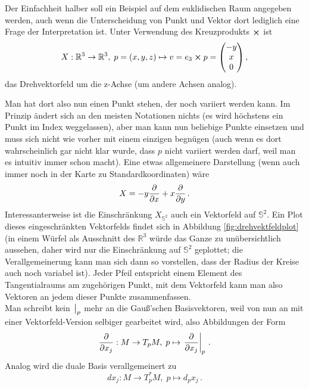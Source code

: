 \documentclass[../H_Analysis_main.tex]{subfiles}
\begin{document}
\begin{bsp}[Drehvektorfeld]\label{bsp:drehvekt}
Der Einfachheit halber soll ein Beispiel auf dem euklidischen Raum angegeben werden, auch wenn die Unterscheidung von Punkt und Vektor dort lediglich eine Frage der Interpretation ist. Unter Verwendung des Kreuzprodukts $\cross$ ist
\begin{equation}
X: \mathbb{R}^3 \rightarrow \mathbb{R}^3, \; p = (x, y, z) \mapsto v = e_3 \cross p = \mqty(-y \\ x \\ 0) \, ,
\end{equation}
das Drehvektorfeld um die z-Achse (um andere Achsen analog).

Man hat dort also nun einen Punkt stehen, der noch variiert werden kann. Im Prinzip ändert sich an den meisten Notationen nichts (es wird höchstens ein Punkt im Index weggelassen), aber man kann nun beliebige Punkte einsetzen und muss sich nicht wie vorher mit einem einzigen begnügen (auch wenn es dort wahrscheinlich gar nicht klar wurde, dass $p$ nicht variiert werden darf, weil man es intuitiv immer schon macht). Eine etwas allgemeinere Darstellung (wenn auch immer noch in der Karte zu Standardkoordinaten) wäre
\begin{equation}
X = -y \pdv{x} + x \pdv{y} \, .
\end{equation}
Interessanterweise ist die Einschränkung $X_{\mathbb{S}^2}$ auch ein Vektorfeld auf $\mathbb{S}^2$. Ein Plot dieses eingeschränkten Vektorfelds findet sich in Abbildung \ref{fig:drehvektfeldplot} (in einem Würfel als Ausschnitt des $\mathbb{R}^3$ würde das Ganze zu unübersichtlich aussehen, daher wird nur die Einschränkung auf $\mathbb{S}^2$ geplottet; die Verallgemeinerung kann man sich dann so vorstellen, dass der Radius der Kreise auch noch variabel ist). Jeder Pfeil entspricht einem Element des Tangentialraums am zugehörigen Punkt, mit dem Vektorfeld kann man also Vektoren an jedem dieser Punkte zusammenfassen.\\


Man schreibt  kein $\eval{}_p$ mehr an die Gauß'schen Basisvektoren, weil von nun an mit einer Vektorfeld-Version selbiger gearbeitet wird, also Abbildungen der Form
\begin{equation}
\pdv{x_j}: M \rightarrow T_p M, \; p \mapsto \eval{\pdv{x_j}}_p \, .
\end{equation}
Analog wird die duale Basis verallgemeinert zu
\begin{equation}
dx_j: M \rightarrow T^*_p M, \; p \mapsto d_p x_j \, .
\end{equation}
\end{bsp}
\end{document}
